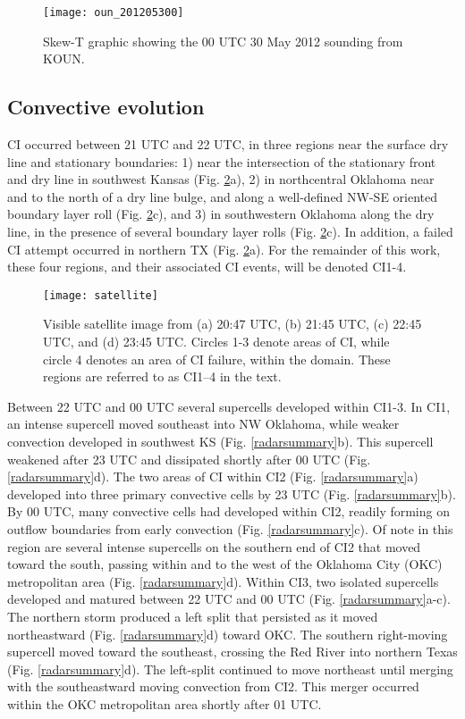 \begin{figure}
\centering
\texttt{[image: oun\_201205300]}
\caption{Skew-T graphic showing the 00 UTC 30 May 2012 sounding from KOUN.}
\label{skewt}
\end{figure}

\subsection{Convective evolution}
CI occurred between 21 UTC and 22 UTC, in three regions near the surface dry line and stationary boundaries: 1) near the intersection of the stationary front and dry line in southwest Kansas (Fig. \ref{satellite}a), 2) in northcentral Oklahoma near and to the north of a dry line bulge, and along a well-defined NW-SE oriented boundary layer roll (Fig. \ref{satellite}c), and 3) in southwestern Oklahoma along the dry line, in the presence of several boundary layer rolls (Fig. \ref{satellite}c). In addition, a failed CI attempt occurred in northern TX (Fig. \ref{satellite}a). For the remainder of this work, these four regions, and their associated CI events, will be denoted CI1-4.

\begin{figure}
\centering
\texttt{[image: satellite]}
\caption{Visible satellite image from (a) 20:47 UTC, (b) 21:45 UTC, (c) 22:45 UTC, and (d) 23:45 UTC. Circles 1-3 denote areas of CI, while circle 4 denotes an area of CI failure, within the domain. These regions are referred to as CI1--4 in the text.}
\label{satellite}
\end{figure}

Between 22 UTC and 00 UTC several supercells developed within CI1-3. In CI1, an intense supercell moved southeast into NW Oklahoma, while weaker convection developed in southwest KS (Fig. \ref{radarsummary}b). This supercell weakened after 23 UTC and dissipated shortly after 00 UTC (Fig. \ref{radarsummary}d). The two areas of CI within CI2 (Fig. \ref{radarsummary}a) developed into three primary convective cells by 23 UTC (Fig. \ref{radarsummary}b). By 00 UTC, many convective cells had developed within CI2, readily forming on outflow boundaries from early convection (Fig. \ref{radarsummary}c). Of note in this region are several intense supercells on the southern end of CI2 that moved toward the south, passing within and to the west of the Oklahoma City (OKC) metropolitan area (Fig. \ref{radarsummary}d). Within CI3, two isolated supercells developed and matured between 22 UTC and 00 UTC (Fig. \ref{radarsummary}a-c). The northern storm produced a left split that persisted as it moved northeastward (Fig. \ref{radarsummary}d) toward OKC. The southern right-moving supercell moved toward the southeast, crossing the Red River into northern Texas (Fig. \ref{radarsummary}d). The left-split continued to move northeast until merging with the southeastward moving convection from CI2. This merger occurred within the OKC metropolitan area shortly after 01 UTC.

